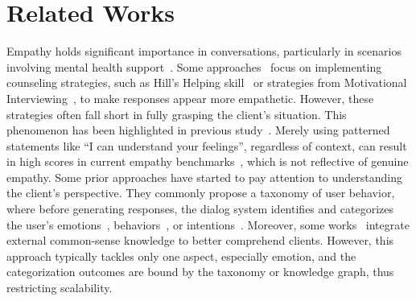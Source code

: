 \section{Related Works}
\label{sec:related}

Empathy holds significant importance in conversations, particularly in scenarios involving mental health support~\cite{liu-etal-2021-towards}. 
Some approaches~\cite{Saha2022Motivational,zheng-etal-2023-augesc} focus on implementing counseling strategies, such as Hill's Helping skill~\cite{Hill2009Helping} or strategies from Motivational Interviewing~\cite{Miller1995MI}, to make responses appear more empathetic. However, these strategies often fall short in fully grasping the client's situation. This phenomenon has been highlighted in previous study~\cite{lee-etal-2023-empathy, Sharma2021Empathy}. Merely using patterned statements like ``I can understand your feelings'', regardless of context, can result in high scores in current empathy benchmarks~\cite{sharma-etal-2020-computational}, which is not reflective of genuine empathy.
Some prior approaches have started to pay attention to understanding the client's perspective. They commonly propose a taxonomy of user behavior, where before generating responses, the dialog system identifies and categorizes the user's emotions~\cite{rashkin-etal-2019-towards}, behaviors~\cite{qiu2023psychat}, or intentions~\cite{Su2023EmpatheticDG}. Moreover, some works~\cite{Li2020KnowledgeBF} integrate external common-sense knowledge to better comprehend clients. However, this approach typically tackles only one aspect, especially emotion, and the categorization outcomes are bound by the taxonomy or knowledge graph, thus restricting scalability.